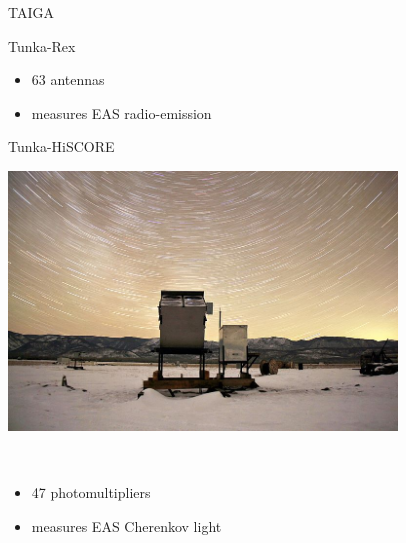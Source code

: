 \begin{frame}{TAIGA}
\begin{minipage}[t]{0.31\textwidth}
\begin{block}{\small Tunka-Rex}
{    }
    \\
    \parbox[c][0.15\textheight][t]{1\textwidth}{
      \begin{itemize}
        \setlength{\itemsep}{0pt}
        \item 63 antennas
        \item measures EAS radio-emission
      \end{itemize}
    }
  \end{block}
\end{minipage}
\hfill
\begin{minipage}[t]{0.31\textwidth}
  \begin{block}{\small Tunka-HiSCORE}
    \parbox[c][0.20\textheight][t]{1\textwidth}{
      \centering
      \includegraphics[width=0.7742\textwidth]{pics/Tunka-HiSCORE.jpg}
    }
    \\
    \parbox[c][0.15\textheight][t]{1\textwidth}{
      \begin{itemize}
        \setlength{\itemsep}{0pt}
        \item 47 photomultipliers
        \item measures EAS Cherenkov light
      \end{itemize}
    }
  \end{block}
\end{minipage}


\end{frame}
